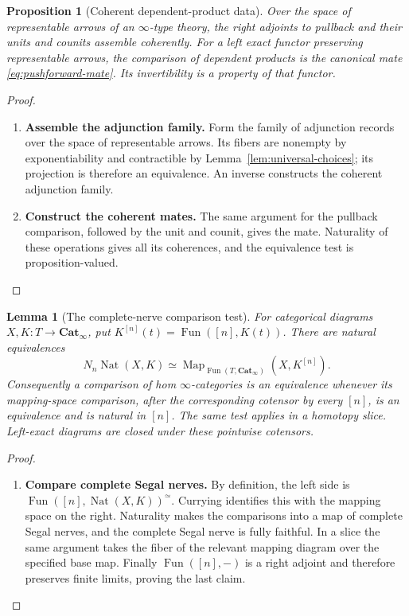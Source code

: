 \documentclass[oneside]{article}
\theoremstyle{plain}
\newtheorem{lemma}[theorem]{Lemma}
\newtheorem{proposition}[theorem]{Proposition}
\theoremstyle{definition}
\theoremstyle{remark}
\newcommand{\Cat}{\mathbf{Cat}_{\infty}}
\newcommand{\Fun}{\operatorname{Fun}}
\newcommand{\Map}{\operatorname{Map}}
\newcommand{\Nat}{\operatorname{Nat}}
\newcommand{\core}{\simeq}
\begin{document}
\begin{proposition}[Coherent dependent-product data]\label{prop:coherent-dependent-data}
    Over the space of representable arrows of an $\infty$-type theory, the right adjoints to pullback and their units and counits assemble coherently. For a left exact functor preserving representable arrows, the comparison of dependent products is the canonical mate \eqref{eq:pushforward-mate}. Its invertibility is a property of that functor.
\end{proposition}
\begin{proof}
    \leavevmode
    \begin{enumerate}
        \item \textbf{Assemble the adjunction family.} Form the family of adjunction records over the space of representable arrows. Its fibers are nonempty by exponentiability and contractible by Lemma~\ref{lem:universal-choices}; its projection is therefore an equivalence. An inverse constructs the coherent adjunction family.
    
        \item \textbf{Construct the coherent mates.} The same argument for the pullback comparison, followed by the unit and counit, gives the mate. Naturality of these operations gives all its coherences, and the equivalence test is proposition-valued.\qedhere
    \end{enumerate}
\end{proof}

\begin{lemma}[The complete-nerve comparison test]
\label{lem:complete-nerve-comparison}
    For categorical diagrams $X,K:T\to\Cat$, put $K^{[n]}(t)=\Fun([n],K(t))$. There are natural equivalences
    \[
        N_n\Nat(X,K)\simeq
        \Map_{\Fun(T,\Cat)}(X,K^{[n]}).
    \]
    Consequently a comparison of hom $\infty$-categories is an equivalence whenever its mapping-space comparison, after the corresponding cotensor by every $[n]$, is an equivalence and is natural in $[n]$. The same test applies in a homotopy slice. Left-exact diagrams are closed under these pointwise cotensors.
\end{lemma}
\begin{proof}
    \leavevmode
    \begin{enumerate}
        \item \textbf{Compare complete Segal nerves.} By definition, the left side is $\Fun([n],\Nat(X,K))^\core$. Currying identifies this with the mapping space on the right. Naturality makes the comparisons into a map of complete Segal nerves, and the complete Segal nerve is fully faithful. In a slice the same argument takes the fiber of the relevant mapping diagram over the specified base map. Finally $\Fun([n],-)$ is a right adjoint and therefore preserves finite limits, proving the last claim.\qedhere
    \end{enumerate}
\end{proof}
\end{document}
